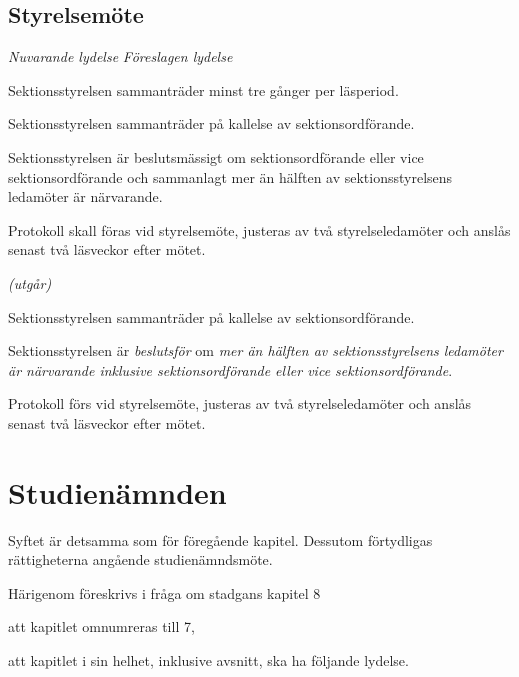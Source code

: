 \documentclass{article}
\newenvironment{lydelse}
    {\begin{paracol}{2}%
        \emph{Nuvarande lydelse}%
        \switchcolumn%
        \emph{Föreslagen lydelse}%
    \end{paracol}%
    \begin{enumerate}[label=\thesubsection.\arabic*]%
    \begin{paracol}{2}%
    }{\end{paracol}\end{enumerate}}
\begin{document}
\subsection{Styrelsemöte}
\begin{lydelse}
  \setcounter{section}{7}
  \setcounter{subsection}{5}
  \item Sektionsstyrelsen sammanträder minst tre gånger per läsperiod.
  \item Sektionsstyrelsen sammanträder på kallelse av sektionsordförande.
  \setcounter{subsection}{6}
  \setcounter{enumi}{0}
  \item Sektionsstyrelsen är beslutsmässigt om sektionsordförande eller vice sektionsordförande och sammanlagt mer än hälften av sektionsstyrelsens ledamöter är närvarande.
  \setcounter{subsection}{8}
  \setcounter{enumi}{0}
  \item Protokoll skall föras vid styrelsemöte, justeras av två
    styrelseledamöter och anslås senast två läsveckor efter mötet.
  \switchcolumn  

  \item[] \emph{(utgår)}
  \item Sektionsstyrelsen sammanträder på kallelse av sektionsordförande.
  \item Sektionsstyrelsen är \emph{beslutsför} om \emph{mer än hälften av sektionsstyrelsens ledamöter är närvarande inklusive sektionsordförande eller vice sektionsordförande}.
  \item Protokoll förs vid styrelsemöte, justeras av två styrelseledamöter och anslås senast två läsveckor efter mötet.
\end{lydelse}
\setcounter{section}{6}
\setcounter{subsection}{2}

\section{Studienämnden}
Syftet är detsamma som för föregående kapitel.
Dessutom förtydligas rättigheterna angående studienämndsmöte.

Härigenom föreskrivs i fråga om stadgans kapitel 8
\begin{dels}
\item att kapitlet omnumreras till 7,
\item att kapitlet i sin helhet, inklusive avsnitt, ska ha följande lydelse.
\end{dels}
\end{document}
